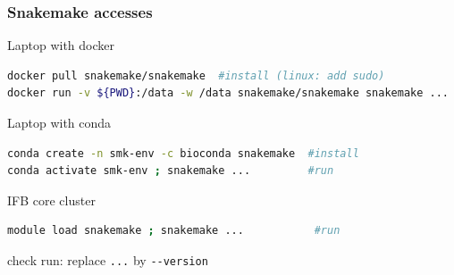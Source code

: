 \begin{frame}[containsverbatim]
\frametitle{Snakemake accesses}
\begin{block}{Laptop with docker}
\begin{lstlisting}[language=bash]
docker pull snakemake/snakemake  #install (linux: add sudo)
docker run -v ${PWD}:/data -w /data snakemake/snakemake snakemake ...  #run
\end{lstlisting}
\end{block}
\begin{block}{Laptop with conda}
\begin{lstlisting}[language=bash]
conda create -n smk-env -c bioconda snakemake  #install
conda activate smk-env ; snakemake ...         #run
\end{lstlisting}
\end{block}
\begin{block}{IFB core cluster}
\begin{lstlisting}[language=bash]
module load snakemake ; snakemake ...           #run
\end{lstlisting}
\end{block}
check run: replace \verb|...| by \verb|--version|
\end{frame}